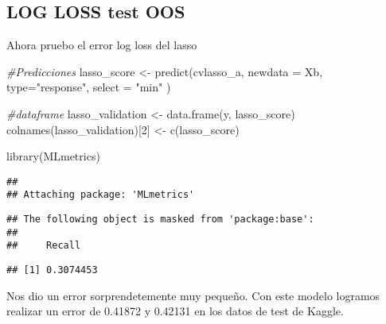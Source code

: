 \documentclass[
]{book}
\newenvironment{Shaded}{\begin{snugshade}}{\end{snugshade}}
\newcommand{\AttributeTok}[1]{\textcolor[rgb]{0.77,0.63,0.00}{#1}}
\newcommand{\CommentTok}[1]{\textcolor[rgb]{0.56,0.35,0.01}{\textit{#1}}}
\newcommand{\DecValTok}[1]{\textcolor[rgb]{0.00,0.00,0.81}{#1}}
\newcommand{\FunctionTok}[1]{\textcolor[rgb]{0.00,0.00,0.00}{#1}}
\newcommand{\NormalTok}[1]{#1}
\newcommand{\OtherTok}[1]{\textcolor[rgb]{0.56,0.35,0.01}{#1}}
\newcommand{\SpecialCharTok}[1]{\textcolor[rgb]{0.00,0.00,0.00}{#1}}
\newcommand{\StringTok}[1]{\textcolor[rgb]{0.31,0.60,0.02}{#1}}
\begin{document}
\hypertarget{log-loss-test-oos}{%
\subsection{LOG LOSS test OOS}\label{log-loss-test-oos}}

Ahora pruebo el error log loss del lasso

\begin{Shaded}
\begin{Highlighting}[]
\CommentTok{\#Predicciones}
\NormalTok{lasso\_score }\OtherTok{\textless{}{-}} \FunctionTok{predict}\NormalTok{(cvlasso\_a,}
               \AttributeTok{newdata =}\NormalTok{ Xb,}
               \AttributeTok{type=}\StringTok{"response"}\NormalTok{,}
               \AttributeTok{select =} \StringTok{"min"}\NormalTok{ )}


\CommentTok{\#dataframe}
\NormalTok{lasso\_validation }\OtherTok{\textless{}{-}} \FunctionTok{data.frame}\NormalTok{(y, lasso\_score)}
\FunctionTok{colnames}\NormalTok{(lasso\_validation)[}\DecValTok{2}\NormalTok{] }\OtherTok{\textless{}{-}} \FunctionTok{c}\NormalTok{(}\StringTok{\textquotesingle{}lasso\_score\textquotesingle{}}\NormalTok{)}

\FunctionTok{library}\NormalTok{(MLmetrics)}
\end{Highlighting}
\end{Shaded}

\begin{verbatim}
## 
## Attaching package: 'MLmetrics'
\end{verbatim}

\begin{verbatim}
## The following object is masked from 'package:base':
## 
##     Recall
\end{verbatim}

\begin{Shaded}
\end{Shaded}

\begin{verbatim}
## [1] 0.3074453
\end{verbatim}

Nos dio un error sorprendetemente muy pequeño. Con este modelo logramos realizar un error de 0.41872 y 0.42131 en los datos de test de Kaggle.
\end{document}
